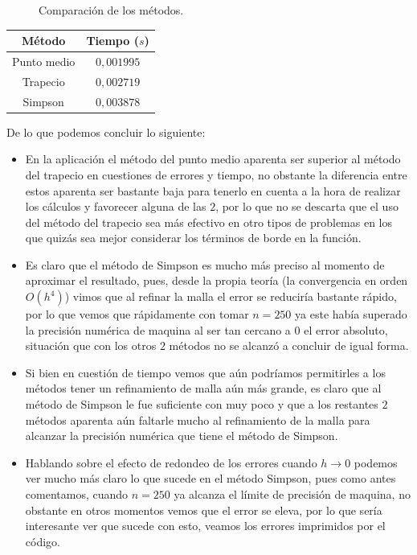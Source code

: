 \begin{homeworkProblem}
\begin{enumerate}
\begin{solucion}
\begin{figure}[H]
\begin{center}
        \end{center}
        \caption{Comparación de los métodos.}
        \end{figure}
        \begin{center}
        \begin{tabular}{|c|c|}
          \hline
          Método & Tiempo ($s$)\\
          \hline
          Punto medio & $0,001995$\\
          \hline
          Trapecio & $0,002719$\\
          \hline
          Simpson & $0,003878$\\
          \hline
        \end{tabular}
        \end{center}
        De lo que podemos concluir lo siguiente:
        \begin{itemize}
          \item En la aplicación el método del punto medio aparenta ser superior al método del trapecio en cuestiones de errores y tiempo, no obstante la diferencia entre estos aparenta ser bastante baja para tenerlo en cuenta a la hora de realizar los cálculos y favorecer alguna de las $2$, por lo que no se descarta que el uso del método del trapecio sea más efectivo en otro tipos de problemas en los que quizás sea mejor considerar los términos de borde en la función.
          \item Es claro que el método de Simpson es mucho más preciso al momento de aproximar el resultado, pues, desde la propia teoría (la convergencia en orden $O(h^4)$) vimos que al refinar la malla el error se reduciría bastante rápido, por lo que vemos que rápidamente con tomar $n=250$ ya este había superado la precisión numérica de maquina al ser tan cercano a $0$ el error absoluto, situación que con los otros $2$ métodos no se alcanzó a concluir de igual forma.
          \item Si bien en cuestión de tiempo vemos que aún podríamos permitirles a los métodos tener un refinamiento de malla aún más grande, es claro que al método de Simpson le fue suficiente con muy poco y que a los restantes $2$ métodos aparenta aún faltarle mucho al refinamiento de la malla para alcanzar la precisión numérica que tiene el método de Simpson.
          \item Hablando sobre el efecto de redondeo de los errores cuando $h\to 0$ podemos ver mucho más claro lo que sucede en el método Simpson, pues como antes comentamos, cuando $n=250$ ya alcanza el límite de precisión de maquina, no obstante en otros momentos vemos que el error se eleva, por lo que sería interesante ver que sucede con esto, veamos los errores imprimidos por el código.\\

\end{itemize}
\end{solucion}
\end{enumerate}
\end{homeworkProblem}
